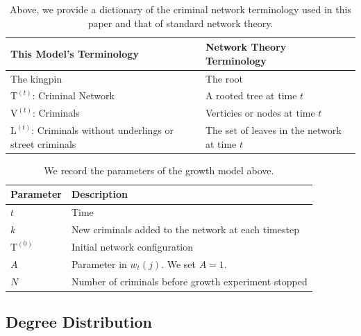 \documentclass[%
 reprint,
 amsmath,amssymb,
 aps,
]{revtex4-1}
\renewcommand{\L}{\mathrm{L}}
\newcommand{\T}{\mathrm{T}}
\newcommand{\V}{\mathrm{V}}
\theoremstyle{plain}
\theoremstyle{definition}
\begin{document}
\begin{table}\centering
\begin{tabular}{|m{8cm}|m{8cm}|}
\hline
This Model's Terminology&Network Theory Terminology\\
\hline
\hline
The kingpin& The root\\
\hline
$\T^{(t)}$: Criminal Network& A rooted tree at time $t$\\
\hline
$\V^{(t)}$: Criminals & Verticies or nodes at time $t$\\
\hline
$\L^{(t)}$: Criminals without underlings or street criminals& The set of leaves in the network at time $t$\\
\hline
\end{tabular}
\caption{Above, we provide a dictionary of the criminal network terminology used in this paper and that of standard network theory.}
\end{table}
\begin{table}\centering
  \begin{tabular}{|m{4cm}|p{12cm}|}
\hline
Parameter&Description\\
\hline
\hline
$t$& Time\\
\hline
$k$ & New criminals added to the network at each timestep\\
\hline
$\T^{(0)}$& Initial network configuration\\
\hline
$A$& Parameter in $w_t(j)$.  We set $A = 1$.\\
\hline
$N$& Number of criminals before growth experiment stopped\\
\hline
\end{tabular}
  \caption{We record the parameters of the growth model above.}
\end{table}

  
  
\subsection*{Degree Distribution}
\end{document}
